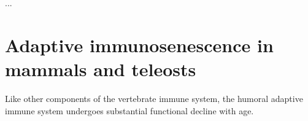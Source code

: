 ...



\section{Adaptive immunosenescence in mammals and teleosts} %

Like other components of the vertebrate immune system, the humoral adaptive immune system undergoes substantial functional decline with age. 

